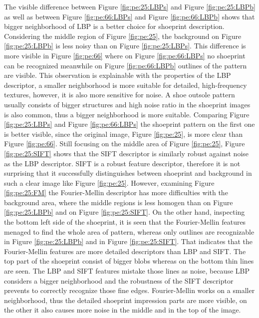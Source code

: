 \documentclass[draft,final]{vutinfth} %
\begin{document}
\par
The visible difference between Figure \ref{fig:pe:25:LBPs} and Figure \ref{fig:pe:25:LBPb} as well as between Figure \ref{fig:pe:66:LBPs} and Figure \ref{fig:pe:66:LBPb} shows that bigger neighborhood of LBP is a better choice for shoeprint description.
Considering the middle region of Figure \ref{fig:pe:25}, the background on Figure \ref{fig:pe:25:LBPb} is less noisy than on Figure \ref{fig:pe:25:LBPs}.
This difference is more visible in  Figure \ref{fig:pe:66} where on Figure \ref{fig:pe:66:LBPs} no shoeprint can be recognized meanwhile on Figure \ref{fig:pe:66:LBPb} outlines of the pattern are visible.
This observation is explainable with the properties of the LBP descriptor, a smaller neighborhood is more suitable for detailed, high-frequency textures, however, it is also more sensitive for noise.
A shoe outsole pattern usually consists of bigger structures and high noise ratio in the shoeprint images is also common, thus a bigger neighborhood is more suitable.
Comparing Figure \ref{fig:pe:25:LBPs} and Figure \ref{fig:pe:66:LBPs} the shoeprint pattern on the first one is better visible, since the original image, Figure \ref{fig:pe:25}, is more clear than Figure \ref{fig:pe:66}.
Still focusing on the middle area of Figure \ref{fig:pe:25}, Figure \ref{fig:pe:25:SIFT} shows that the SIFT descriptor is similarly robust against noise as the LBP descriptor.
SIFT is a robust feature descriptor, therefore it is not surprising that it successfully distinguishes between shoeprint and background in such a clear image like Figure \ref{fig:pe:25}.
However, examining Figure  \ref{fig:pe:25:FM} the Fourier-Mellin descriptor has more difficulties with the background area, where the middle regions is less homogen than on  Figure \ref{fig:pe:25:LBPb} and on Figure \ref{fig:pe:25:SIFT}.
On the other hand, inspecting the bottom left side of the shoeprint, it is seen that the Fourier-Mellin features menaged to find the whole area of pattern, whereas only outlines are recognizable in Figure \ref{fig:pe:25:LBPb} and in Figure \ref{fig:pe:25:SIFT}.
That indicates that the Fourier-Mellin features are more detailed descriptors than LBP and SIFT. 
The top part of the shoeprint consist of bigger blobs whereas on the bottom thin lines are seen.
The LBP and SIFT features mistake those lines as noise, because LBP considers a bigger neighborhood and the robustness of the SIFT descriptor prevents to correctly recognize those fine edges.
Fourier-Mellin works on a smaller neighborhood, thus the detailed shoeprint impression parts are more visible, on the other it also causes more noise in the middle and in the top of the image.
\end{document}
